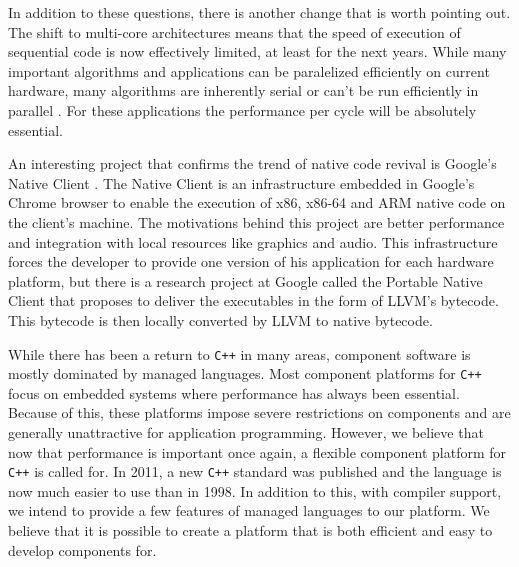 In addition to these questions, there is another change that is worth pointing out. The shift to multi-core architectures means that the speed of
execution of sequential code is now effectively limited, at least for the next years. While many important algorithms and applications can be paralelized efficiently
on current hardware, many algorithms are inherently serial or can't be run efficiently in parallel \cite{Madriles}. For these applications the performance per cycle
will be absolutely essential.

An interesting project that confirms the trend of native code revival is Google's Native Client \cite{NaCl}. The Native Client is an infrastructure embedded in Google's Chrome browser
to enable the execution of x86, x86-64 and ARM native code on the client's machine. The motivations behind this project are better performance and integration with local
resources like graphics and audio. This infrastructure forces the developer to provide one version of his application for each hardware platform, but there is a research
project at Google called the Portable Native Client \cite{pNaCl} that proposes to deliver the executables in the form of LLVM's bytecode. This bytecode is then locally converted by LLVM to
native bytecode.

While there has been a return to \texttt{C++} in many areas, component software is mostly dominated by managed languages. Most
component platforms for \texttt{C++} focus on embedded systems where performance has always been essential. Because of this,
these platforms impose severe restrictions on components and are generally unattractive for application programming.
However, we believe that now that performance is important once again, a flexible component platform for \texttt{C++} is called
for. In 2011, a new \texttt{C++} standard was published \cite{CPP11} and the language is now much easier to use than in 1998.
In addition to this, with compiler support, we intend to provide a few features of managed languages to our platform.
We believe that it is possible to create a platform that is both efficient and easy to develop components for.
